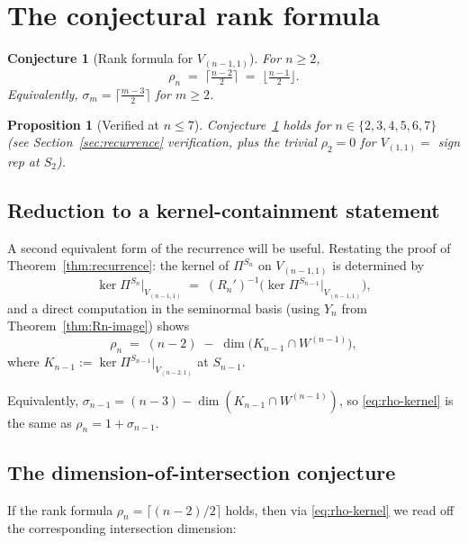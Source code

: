 \documentclass[11pt]{article}
\newtheorem{proposition}[theorem]{Proposition}
\newtheorem{conjecture}[theorem]{Conjecture}
\theoremstyle{definition}
\begin{document}
\section{The conjectural rank formula}\label{sec:formula}

\begin{conjecture}[Rank formula for $V_{(n-1,1)}$]\label{conj:rank-formula}
For $n \ge 2$,
\begin{equation}\label{eq:rank-formula}
   \rho_n \;=\; \big\lceil\tfrac{n-2}{2}\big\rceil
     \;=\; \big\lfloor\tfrac{n-1}{2}\big\rfloor.
\end{equation}
Equivalently, $\sigma_m = \big\lceil\tfrac{m-3}{2}\big\rceil$ for $m \ge 2$.
\end{conjecture}

\begin{proposition}[Verified at $n \le 7$]
Conjecture~\ref{conj:rank-formula} holds for $n \in \{2, 3, 4, 5, 6, 7\}$
(see Section~\ref{sec:recurrence} verification, plus the trivial
$\rho_2 = 0$ for $V_{(1,1)} = $ sign rep at $S_2$).
\end{proposition}

\subsection{Reduction to a kernel-containment statement}

A second equivalent form of the recurrence will be useful. Restating the
proof of Theorem~\ref{thm:recurrence}: the kernel of $\Pi^{S_n}$ on
$V_{(n-1,1)}$ is determined by
\[
   \ker\Pi^{S_n}\big|_{V_{(n-1,1)}}
   \;=\; (R_n')^{-1}\bigl(\ker\Pi^{S_{n-1}}\big|_{V_{(n-1,1)}}\bigr),
\]
and a direct computation in the seminormal basis (using $Y_n$ from
Theorem~\ref{thm:Rn-image}) shows
\begin{equation}\label{eq:rho-kernel}
   \rho_n \;=\; (n-2) \;-\; \dim\bigl(K_{n-1} \cap W^{(n-1)}\bigr),
\end{equation}
where $K_{n-1} := \ker\Pi^{S_{n-1}}|_{V_{(n-2,1)}}$ at $S_{n-1}$.

Equivalently, $\sigma_{n-1} = (n-3) - \dim(K_{n-1} \cap W^{(n-1)})$, so
\eqref{eq:rho-kernel} is the same as $\rho_n = 1 + \sigma_{n-1}$.

\subsection{The dimension-of-intersection conjecture}

If the rank formula $\rho_n = \lceil(n-2)/2\rceil$ holds, then via
\eqref{eq:rho-kernel} we read off the corresponding intersection
dimension:
\end{document}
